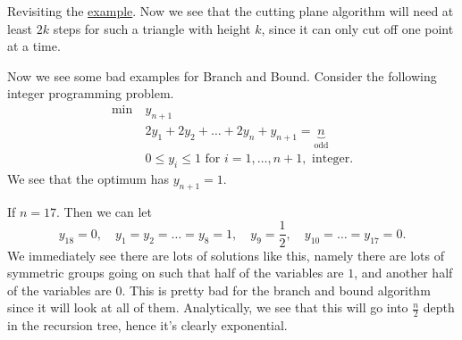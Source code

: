 Revisiting the \hyperref[eg:branch-and-bound]{example}. Now we see that the cutting plane algorithm will need at least \(2k\) steps
for such a triangle with height \(k\), since it can only cut off one point at a time.

\begin{eg}
	Now we see some bad examples for Branch and Bound. Consider the following integer programming problem.
	\begin{align*}
		\min~ & y_{n+1}                                                              \\
		      & 2y_{1} + 2y_2 + \ldots +2y_n + y_{n+1} = \underbrace{n}_{\text{odd}} \\
		      & 0\leq y_{i}\leq 1 \text{ for }i = 1, \ldots , n+1, \text{ integer}.
	\end{align*}
	We see that the optimum has \(y_{n+1} = 1\).

	If \(n = 17\). Then we can let
	\[
		y_{18} = 0,\quad y_1 = y_2 = \ldots = y_8 = 1,\quad y_9 = \frac{1}{2},\quad y_{10} = \ldots = y_{17} = 0.
	\]
	We immediately see there are lots of solutions like this, namely there are lots of symmetric groups going on such that
	half of the variables are \(1\), and another half of the variables are \(0\). This is pretty bad
	for the branch and bound algorithm since it will look at all of them. Analytically, we see that this will go into \(\frac{n}{2}\)
	depth in the recursion tree, hence it's clearly exponential.
\end{eg}